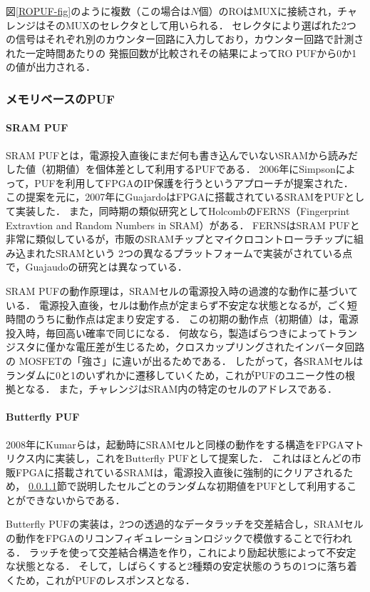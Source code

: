 \documentclass[technicalreport]{ieicej} %
\begin{document}
図\ref{ROPUF-fig}のように複数（この場合は$N$個）のROはMUXに接続され，チャレンジはそのMUXのセレクタとして用いられる．
セレクタにより選ばれた2つの信号はそれぞれ別のカウンター回路に入力しており，カウンター回路で計測された一定時間あたりの
発振回数が比較されその結果によってRO PUFから0か1の値が出力される．
\subsubsection{メモリベースのPUF}
\label{memorypuf}
\paragraph{SRAM PUF}
\label{SRAM PUF}
SRAM PUFとは，電源投入直後にまだ何も書き込んでいないSRAMから読みだした値（初期値）を個体差として利用するPUFである\cite{sugatake}．
2006年にSimpsonによって，PUFを利用してFPGAのIP保護を行うというアプローチ\cite{simpson}が提案された．
この提案を元に，2007年にGuajardoはFPGAに搭載されているSRAMをPUFとして実装\cite{guajaudo}した．
また，同時期の類似研究としてHolcombのFERNS（Fingerprint Extravtion and Random Numbers in SRAM）\cite{holcomb}がある．
FERNSはSRAM PUFと非常に類似しているが，市販のSRAMチップとマイクロコントローラチップに組み込まれたSRAMという
2つの異なるプラットフォームで実装がされている点で，Guajaudoの研究とは異なっている\cite{maes1}．

SRAM PUFの動作原理は，SRAMセルの電源投入時の過渡的な動作に基づいている．
電源投入直後，セルは動作点が定まらず不安定な状態となるが，ごく短時間のうちに動作点は定まり安定する．
この初期の動作点（初期値）は，電源投入時，毎回高い確率で同じになる．
何故なら，製造ばらつきによってトランジスタに僅かな電圧差が生じるため，クロスカップリングされたインバータ回路の
MOSFETの「強さ」に違いが出るためである\cite{maes1}．
したがって，各SRAMセルはランダムに0と1のいずれかに遷移していくため，これがPUFのユニーク性の根拠となる．
また，チャレンジはSRAM内の特定のセルのアドレスである．
\paragraph{Butterfly PUF}
2008年にKumarらは，起動時にSRAMセルと同様の動作をする構造をFPGAマトリクス内に実装し，これをButterfly PUF\cite{kumar}として提案した．
これはほとんどの市販FPGAに搭載されているSRAMは，電源投入直後に強制的にクリアされるため，
\ref{SRAM PUF}節で説明したセルごとのランダムな初期値をPUFとして利用することができないからである．

Butterfly PUFの実装は，2つの透過的なデータラッチを交差結合し，SRAMセルの動作をFPGAのリコンフィギュレーションロジックで模倣することで行われる．
ラッチを使って交差結合構造を作り，これにより励起状態によって不安定な状態となる．
そして，しばらくすると2種類の安定状態のうちの1つに落ち着くため，これがPUFのレスポンスとなる．
\end{document}
